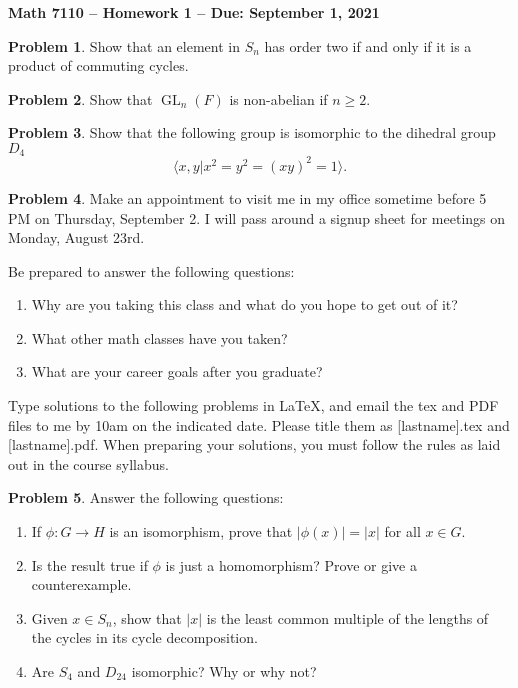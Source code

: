 \documentclass[letterpaper,11pt]{amsart}
\theoremstyle{plain}
\theoremstyle{definition}
\newtheorem{pr}{Problem}
\theoremstyle{remark}
\DeclareMathOperator{\gl}{GL}
\begin{document}
\Large

\begin{center}
{\bf Math 7110 -- Homework  1 --  Due:  September 1, 2021}
\end{center}

\normalsize



\medskip


\begin{pr}
    Show that an element in $S_n$ has order two if and only if it is a product of commuting cycles.
\end{pr}

\begin{pr}
    Show that $\gl_n(F)$ is non-abelian if $n \ge 2$.
\end{pr}

\begin{pr}
    Show that the following group is isomorphic to the dihedral group $D_4$
    \[
        \langle x,y | x^2=y^2=(xy)^2=1 \rangle.
    \]
\end{pr}

\begin{pr}
Make an appointment to visit me 
in my office sometime before 5 PM on Thursday, September 2.  I will pass around
a signup sheet for meetings on Monday, August 23rd.

Be prepared
to answer the following questions:
\begin{enumerate}
\item  Why are you taking this class and what do you hope to get out of it?
\item  What other math classes have you taken?
\item  What are your career goals after you graduate?
\end{enumerate}
\end{pr}

\bigskip

Type solutions to the following problems in \LaTeX, and email the tex and PDF files to me by 10am on the indicated date.
Please title them as [lastname].tex and [lastname].pdf.
When preparing your solutions, you must follow the rules as laid out in the course syllabus.

\vspace{.5cm}



\begin{pr}
    Answer the following questions:
    \begin{enumerate}
        \item If $\phi: G\rightarrow H$ is an isomorphism, prove that $|\phi(x)| = |x|$ for all $x \in G$.
        \item Is the result true if $\phi$ is just a homomorphism? Prove or give a counterexample.
        \item Given $x \in S_n$, show that $|x|$ is the least common multiple of the lengths of the cycles in its cycle decomposition.
        \item Are $S_4$ and $D_{24}$ isomorphic? Why or why not?
    \end{enumerate}
\end{pr}
\end{document}
